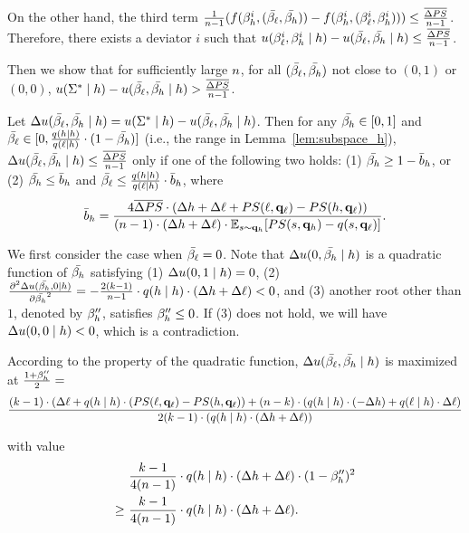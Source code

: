 On the other hand, the third term $\frac{1}{n-1} (f(\beta_{h}^i, (\bar{\beta_{\ell}}, \bar{\beta_{h}})) - f(\beta_{h}^i, (\beta_{\ell}^i, \beta_{h}^i))) \le \frac{\overline{\Delta PS}}{n - 1}$.
Therefore, there exists a deviator $i$ such that $u(\beta_{\ell}^i, \beta_{h}^i \mid h) - u(\bar{\beta_{\ell}}, \bar{\beta_{h}} \mid h) \le \frac{\overline{\Delta PS}}{n - 1}$. 

Then we show that for sufficiently large $n$, for all $(\bar{\beta_{\ell}}, \bar{\beta_{h}})$ not close to $(0,1)$ or $(0, 0)$, $u(\Sigma^* \mid h) - u(\bar{\beta_{\ell}}, \bar{\beta_{h}} \mid h) > \frac{\overline{\Delta PS}}{n - 1}$. 

\begin{lemma}
    \label{lem:corner}
    Let $\Delta u(\bar{\beta_{\ell}}, \bar{\beta_{h}} \mid h) = u(\Sigma^* \mid h) - u(\bar{\beta_{\ell}}, \bar{\beta_{h}} \mid h)$. Then for any $\bar{\beta_{h}} \in [0, 1]$ and $\bar{\beta_{\ell}} \in [0, \frac{q(h\mid h)}{q(\ell \mid h)} \cdot ( 1- \bar{\beta_{h}})]$ (i.e., the range in Lemma~\ref{lem:subspace_h}), $\Delta u(\bar{\beta_{\ell}}, \bar{\beta_{h}} \mid h) \le \frac{\overline{\Delta PS}}{n - 1}$ only if one of the following two holds: (1) $\bar{\beta_{h}} \ge 1 - \bar{b}_h$, or (2) $\bar{\beta_{h}} \le \bar{b}_h$ and $\bar{\beta_{\ell}} \le \frac{q(h \mid h)}{q(\ell \mid h)} \cdot \bar{b}_h$, where 
    \begin{equation*}
   \bar{b}_h = \frac{4\overline{\Delta PS}\cdot (\Delta h + \Delta \ell + PS(\ell, \mathbf{q}_{\ell}) - PS(h, \mathbf{q}_\ell))}{ (n - 1)\cdot (\Delta h +\Delta \ell)\cdot  \mathbb{E}_{s \sim \mathbf{q}_h}[PS(s, \mathbf{q}_h) - q(s, \mathbf{q}_\ell)]}.
\end{equation*}
\end{lemma}


We first consider the case when $\bar{\beta_{\ell}} = 0$. Note that $\Delta u(0, \bar{\beta_{h}} \mid h)$ is a quadratic function of $\bar{\beta_{h}}$ satisfying (1) $\Delta u (0, 1 \mid h) = 0$, (2) $\frac{\partial^2\Delta u (\bar{\beta_{h}}, 0 \mid h)}{\partial \bar{\beta_{h}}^2} = -\frac{2(k - 1)}{n - 1}\cdot q(h\mid h)\cdot (\Delta h + \Delta \ell) < 0$, and (3) another root other than $1$, denoted by $\beta_{h}''$, satisfies $\beta_{h}'' \le  0$. If (3) does not hold, we will have $\Delta u(0, 0 \mid h) < 0$, which is a contradiction. 

According to the property of the quadratic function, $\Delta u(\bar{\beta_{\ell}}, \bar{\beta_{h}} \mid h)$ is maximized at $\frac{1 + \beta_{h}''}{2} = $
\begin{equation*}
\frac{(k -1)\cdot (\Delta \ell + q(h\mid h)\cdot (PS(\ell, \mathbf{q}_{\ell}) - PS(h, \mathbf{q}_\ell)) + (n - k)\cdot (q(h\mid h)\cdot (-\Delta h) + q(\ell \mid h) \cdot \Delta \ell)}{2(k - 1)\cdot (q(h\mid h) \cdot (\Delta h + \Delta \ell))} 
\end{equation*}

with value 
\begin{align*}
    &\ \frac{k - 1}{4(n - 1)}\cdot q(h\mid h)\cdot (\Delta h + \Delta \ell) \cdot (1 - \beta_{h}'')^2\\
    \ge &\ \frac{k - 1}{4(n - 1)}\cdot q(h\mid h)\cdot (\Delta h + \Delta \ell). 
\end{align*}

